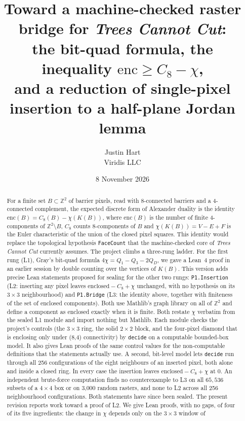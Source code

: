\documentclass[11pt]{article}
\title{Toward a machine-checked raster bridge for \emph{Trees Cannot Cut}:\\
the bit-quad formula, the inequality $\mathrm{enc}\ge C_8-\chi$,\\
and a reduction of single-pixel insertion to a half-plane Jordan lemma}
\author{Justin Hart\\Viridis LLC}
\date{8 November 2026}
\theoremstyle{definition}
\theoremstyle{remark}
\begin{document}
\maketitle

\begin{abstract}
For a finite set $B\subset\mathbb{Z}^2$ of barrier pixels, read with
8-connected barriers and a 4-connected complement, the expected discrete form of
Alexander duality is the identity
$\mathrm{enc}(B) = C_8(B)-\chi(K(B))$, where $\mathrm{enc}(B)$ is the number
of finite 4-components of $\mathbb{Z}^2\setminus B$, $C_8$ counts 8-components of $B$ and $\chi(K(B))=V-E+F$ is the Euler
characteristic of the union of the closed pixel squares. This identity would
replace the topological hypothesis \texttt{FaceCount} that the machine-checked
core of \emph{Trees Cannot Cut} currently assumes. The project climbs a
three-rung ladder. For the first rung (L1), Gray's bit-quad formula
$4\chi = Q_1-Q_3-2Q_D$, we gave a Lean~4 proof in an earlier session by
double counting over the vertices of $K(B)$. This version adds precise Lean
statements proposed for sealing for the other two rungs: \texttt{P1.Insertion}
(L2: inserting any pixel leaves $\text{enclosed}-C_8+\chi$ unchanged, with no
hypothesis on its $3\times3$ neighbourhood) and \texttt{P1.Bridge} (L3: the
identity above, together with finiteness of the set of enclosed components).
Both use Mathlib's graph library on all of $\mathbb{Z}^2$ and define a component
as enclosed exactly when it is finite. Both restate $\chi$ verbatim from the sealed L1
module and import nothing but Mathlib. Each module checks the project's controls (the $3\times3$ ring, the
solid $2\times2$ block, and the four-pixel diamond that is enclosing only under
(8,4) connectivity) by \texttt{decide} on a computable bounded-box model. It also
gives Lean proofs of the same control values for the non-computable definitions
that the statements actually use. A second, bit-level model lets \texttt{decide}
run through all 256 configurations of the eight neighbours of an inserted pixel,
both alone and inside a closed ring. In every case the insertion leaves
$\text{enclosed}-C_8+\chi$ at $0$. An independent brute-force computation finds
no counterexample to L3 on all $65{,}536$ subsets of a $4\times4$ box or on
3{,}000 random rasters, and none to L2 across all 256 neighbourhood
configurations. Both statements have since been sealed. The present revision
reports work toward a proof of L2. We give Lean proofs, with no gaps, of four of
its five ingredients: the change in $\chi$ depends only on the $3\times3$ window of

\end{abstract}
\end{document}
